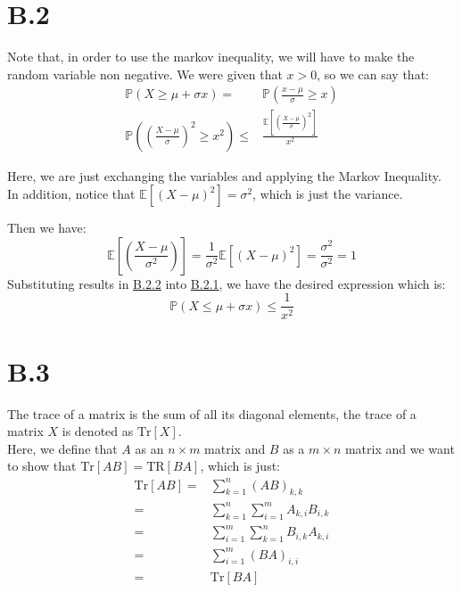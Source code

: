 \documentclass[]{article}
\begin{document}
\section*{B.2}
    \hspace{1.1em}
    Note that, in order to use the markov inequality, we will have to make the random variable non negative. We were given that $x > 0$, so we can say that: 
    \begin{align*}\tag{B.2.1}\label{eqn:B.2.1}
        \mathbb{P}\left(X \ge \mu + \sigma x\right)
        =&  
        \mathbb{P}\left(\frac{x -  \mu}{\sigma} \ge x\right)
        \\
        \mathbb{P}\left(
            \left(
                \frac{X -  \mu}{\sigma}    
            \right)^2
            \ge x^2
            \right) 
        \le&
        \frac{\mathbb{E}\left[
            \left(
                \frac{X - \mu}{\sigma}
            \right)^2
        \right]}{x^2}
    \end{align*}
    \par
    Here, we are just exchanging the variables and applying the Markov Inequality. In addition, notice that $\mathbb{E}\left[(X - \mu)^2\right] = \sigma^2$, which is just the variance. 
    \par
    Then we have: 
    \begin{equation*}\tag{B.2.2}\label{eqn:B.2.2}
        \mathbb{E}\left[
            \left(
                \frac{X - \mu}{\sigma^2}
            \right)
        \right]=
        \frac{1}{\sigma^2} \mathbb{E}\left[
            (X - \mu)^2
        \right]
        =\frac{\sigma^2}{\sigma^2} = 1
    \end{equation*}
    Substituting results in \hyperref[eqn:B.2.2]{B.2.2} into \hyperref[eqn:B.2.1]{B.2.1}, we have the desired expression which is: 
    \begin{equation*}\tag{B.2.3}\label{eqn:B.2.3}
         \mathbb{P}\left(X\le \mu + \sigma x\right)
         \le 
         \frac{1}{x^2}
    \end{equation*}

\section*{B.3}
    The trace of a matrix is the sum of all its diagonal elements, the trace of a matrix $X$ is denoted as $\text{Tr}[X]$. 
    \\
    Here, we define that $A$ as an $n\times m$ matrix and $B$ as a $m\times n$ matrix and we want to show that $\text{Tr}[AB] = \text{TR}[BA]$, which is just: 
    \begin{align*}\tag{B.3.1}\label{eqn:B.3.1}
        \text{Tr}[AB] =& \sum_{k = 1}^{n}(AB)_{k, k}
        \\
        =&
        \sum_{k = 1}^{n}\sum_{i =1}^{m}A_{k, i}B_{i, k}
        \\
        =&
        \sum_{i = 1}^{m}\sum_{k = 1}^{n}B_{i, k}A_{k, i}
        \\
        =&
        \sum_{i = 1}^{m}(BA)_{i, i}
        \\
        =& 
        \text{Tr}[BA]
    \end{align*}
\end{document}
